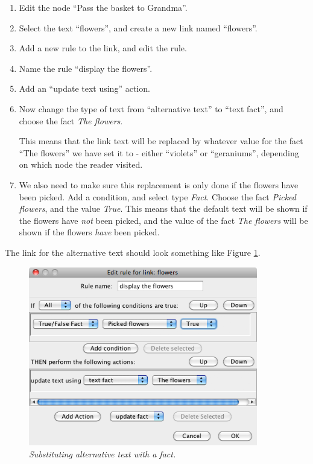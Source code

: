 \documentclass{article}
\begin{document}
\begin{enumerate}
  \item Edit the node ``Pass the basket to Grandma''.
  \item Select the text ``flowers'', and create a new link named ``flowers''.
  \item Add a new rule to the link, and edit the rule.
  \item Name the rule ``display the flowers''.
  \item Add an ``update text using'' action.
  \item Now change the type of text from ``alternative text'' to ``text
  fact'', and choose the fact \textit{The flowers}.

This means that the link text will be replaced by whatever value for the
fact ``The flowers'' we have set it to - either ``violets'' or ``geraniums'',
depending on which node the reader visited. 

\item We also need to make sure this replacement is only done if the flowers have
been picked. Add a condition, and select type \textit{Fact}. Choose the fact
\textit{Picked flowers}, and the value \textit{True}.
  This means that the default text will be shown if the flowers have \textit{not}
  been picked, and the value of the fact \textit{The flowers} will be shown if
  the flowers \textit{have} been picked.
\end{enumerate}

The link for the alternative text should look something like Figure
\ref{fig:tut3:conditional_text}.

\begin{figure}[h]
  \centering
  \includegraphics[width=10cm]{images/hypedyn-tutorial-3-figure-12}
  \caption{\textit{Substituting alternative text with a fact.}}
  \label{fig:tut3:conditional_text}
\end{figure}
\end{document}
